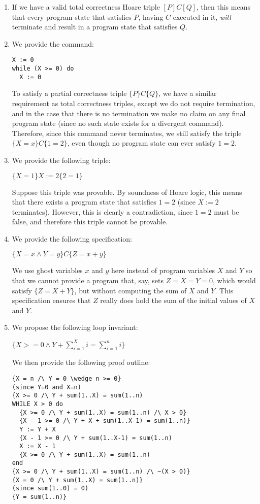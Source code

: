 


\begin{enumerate}[label=(\alph*)]
  \item
    If we have a valid total correctness Hoare triple $[P]C[Q]$, then this means that every program state that satisfies $P$, having $C$ executed in it, \textit{will} terminate and result in a program state that satisfies $Q$.

  \item
    We provide the command:

\begin{verbatim}
X := 0
while (X >= 0) do
  X := 0
\end{verbatim}

To satisfy a partial correctness triple $\{P\}C\{Q\}$, we have a similar requirement as total correctness triples, except we do not require termination, and in the case that there is no termination we make no claim on any final program state (since no such state exists for a divergent command). Therefore, since this command never terminates, we still satisfy the triple $\{X = x\}C\{1=2\}$, even though no program state can ever satisfy $1=2$.

\item
  We provide the following triple:

  $\{X=1\} X := 2 \{2=1\}$

  Suppose this triple was provable. By soundness of Hoare logic, this means that there exists a program state that satisfies $1=2$ (since $X := 2$ terminates). However, this is clearly a contradiction, since $1=2$ must be false, and therefore this triple cannot be provable.

\item
  We provide the following specification:

  $\{X=x \wedge Y=y\}C\{Z = x+y\}$

  We use ghost variables $x$ and $y$ here instead of program variables $X$ and $Y$ so that we cannot provide a program that, say, sets $Z=X=Y=0$, which would satisfy $\{Z = X+Y\}$, but without computing the sum of $X$ and $Y$. This specification ensures that $Z$ really does hold the sum of the initial values of $X$ and $Y$.

\item
  We propose the following loop invariant:

  $\{X >= 0 \wedge Y + \sum_{i=1}^X i = \sum_{i=1}^n i\}$

  We then provide the following proof outline:

\begin{verbatim}
{X = n /\ Y = 0 \wedge n >= 0}
(since Y=0 and X=n)
{X >= 0 /\ Y + sum(1..X) = sum(1..n)
WHILE X > 0 do
  {X >= 0 /\ Y + sum(1..X) = sum(1..n) /\ X > 0}
  {X - 1 >= 0 /\ Y + X + sum(1..X-1) = sum(1..n)}
  Y := Y + X
  {X - 1 >= 0 /\ Y + sum(1..X-1) = sum(1..n)
  X := X - 1
  {X >= 0 /\ Y + sum(1..X) = sum(1..n)
end
{X >= 0 /\ Y + sum(1..X) = sum(1..n) /\ ~(X > 0)}
{X = 0 /\ Y + sum(1..X) = sum(1..n)}
(since sum(1..0) = 0)
{Y = sum(1..n)}
\end{verbatim}

        
\end{enumerate}

